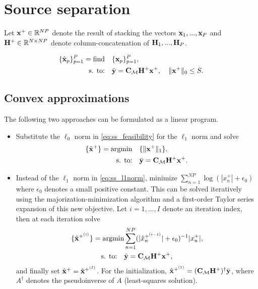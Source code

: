 \documentclass{article}
\def\x{{\mathbf x}}
\def\y{{\mathbf y}}
\begin{document}
\section*{Source separation}

Let ${\mathbf x}^+ \in {\mathbb R}^{NP}$ denote the result of stacking the vectors ${\mathbf x}_1, ..., {\mathbf x}_P$ and ${\mathbf H}^+ \in {\mathbb R}^{N \times NP}$ denote column-concatenation of ${\mathbf H}_1, ..., {\mathbf H}_P$.

\begin{align}
\label{eq:ss_feasibility}
\{\hbx_p\}_{p=1}^P=\mathop{\text{find}} \quad & \{\bbx_p\}_{p=1}^P,  \\
\text{s. to:} \quad & \bar{\y} = \bbC_{\ccalM} \bbH^+ \x^+, \quad \|\x^+\|_{0}\leq S. \nonumber
\end{align}

\subsection*{Convex approximations}

The following two approaches can be formulated as a linear program.

\begin{itemize}
  \item Substitute the $\ell_0$ norm in \eqref{eq:ss_feasibility} for the $\ell_1$ norm and solve
  \begin{align}
  \label{eq:ss_l1norm}
  \{\hbx^+\}=\text{argmin} \quad &\{\|\x^+\|_{1}\}, \\
  \text{s. to:} \quad & \bar{\y} = \bbC_{\ccalM} \bbH^+ \x^+. \nonumber
  \end{align}

  \item Instead of the $\ell_1$ norm in \eqref{eq:ss_l1norm}, minimize $\sum_{n=1}^{NP} \log(|x^+_n|+\epsilon_0)$ where $\epsilon_0$ denotes a small positive constant. This can be solved iteratively using the majorization-minimization algorithm and a first-order Taylor series expansion of this new objective. Let $i=1,...,I$ denote an iteration index, then at each iteration solve
  \begin{align}
  \label{eq:ss_mm}
  \{\hbx^{+^{(i)}}\}=\text{argmin} & \sum_{n=1}^{NP} (|\hat{x}^{+^{(i-1)}}_n| + \epsilon_0)^{-1} |x^+_n|, \\
  \text{s. to:} \quad & \bar{\y} = \bbC_{\ccalM} \bbH^+ \x^+, \nonumber
  \end{align}
    and finally set ${\hat{\mathbf x} }^+={\hat{\mathbf x} }^{+^{(I)}}$. For the initialization, $\hbx^{+^{(1)}}=(\bbC_{\ccalM} \bbH^+)^\dagger \bar{\y}$, where $A^\dagger$ denotes the pseudoinverse of $A$ (least-squares solution).
\end{itemize}
\end{document}
